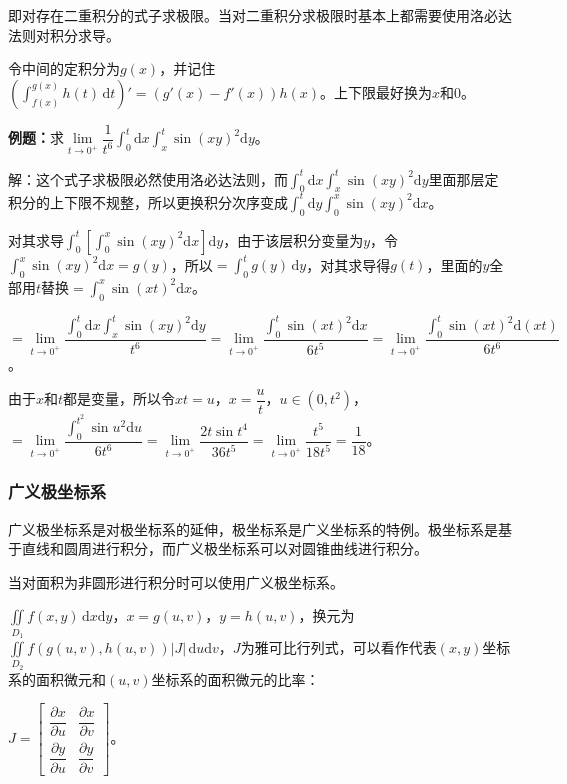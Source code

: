即对存在二重积分的式子求极限。当对二重积分求极限时基本上都需要使用洛必达法则对积分求导。

令中间的定积分为$g(x)$，并记住$(\int_{f(x)}^{g(x)}h(t)\,\textrm{d}t)'=(g'(x)-f'(x))h(x)$。上下限最好换为$x$和$0$。

\textbf{例题：}求$\lim\limits_{t\to0^+}\dfrac{1}{t^6}\int_0^t\textrm{d}x\int_x^t\sin(xy)^2\textrm{d}y$。

解：这个式子求极限必然使用洛必达法则，而$\int_0^t\textrm{d}x\int_x^t\sin(xy)^2\textrm{d}y$里面那层定积分的上下限不规整，所以更换积分次序变成$\int_0^t\textrm{d}y\int_0^x\sin(xy)^2\textrm{d}x$。

对其求导$\int_0^t[\int_0^x\sin(xy)^2\textrm{d}x]\textrm{d}y$，由于该层积分变量为$y$，令$\int_0^x\sin(xy)^2\textrm{d}x=g(y)$，所以$=\int_0^tg(y)\,\textrm{d}y$，对其求导得$g(t)$，里面的$y$全部用$t$替换$=\int_0^x\sin(xt)^2\textrm{d}x$。

$=\lim\limits_{t\to0^+}\dfrac{\int_0^t\textrm{d}x\int_x^t\sin(xy)^2\textrm{d}y}{t^6}=\lim\limits_{t\to0^+}\dfrac{\int_0^t\sin(xt)^2\textrm{d}x}{6t^5}=\lim\limits_{t\to0^+}\dfrac{\int_0^t\sin(xt)^2\textrm{d}(xt)}{6t^6}$。

由于$x$和$t$都是变量，所以令$xt=u$，$x=\dfrac{u}{t}$，$u\in(0,t^2)$，$=\lim\limits_{t\to0^+}\dfrac{\int_0^{t^2}\sin u^2\textrm{d}u}{6t^6}=\lim\limits_{t\to0^+}\dfrac{2t\sin t^4}{36t^5}=\lim\limits_{t\to0^+}\dfrac{t^5}{18t^5}=\dfrac{1}{18}$。

\subsubsection{广义极坐标系}

广义极坐标系是对极坐标系的延伸，极坐标系是广义坐标系的特例。极坐标系是基于直线和圆周进行积分，而广义极坐标系可以对圆锥曲线进行积分。

当对面积为非圆形进行积分时可以使用广义极坐标系。

$\iint\limits_{D_1}f(x,y)\,\textrm{d}x\textrm{d}y$，$x=g(u,v)$，$y=h(u,v)$，换元为$\iint\limits_{D_2}f(g(u,v),h(u,v))\vert J\vert\,\textrm{d}u\textrm{d}v$，$J$为雅可比行列式，可以看作代表$(x,y)$坐标系的面积微元和$(u,v)$坐标系的面积微元的比率：

$J=\left[\begin{array}{cc}
    \dfrac{\partial x}{\partial u} & \dfrac{\partial x}{\partial v} \\
    \dfrac{\partial y}{\partial u} & \dfrac{\partial y}{\partial v}
\end{array}\right]$。

